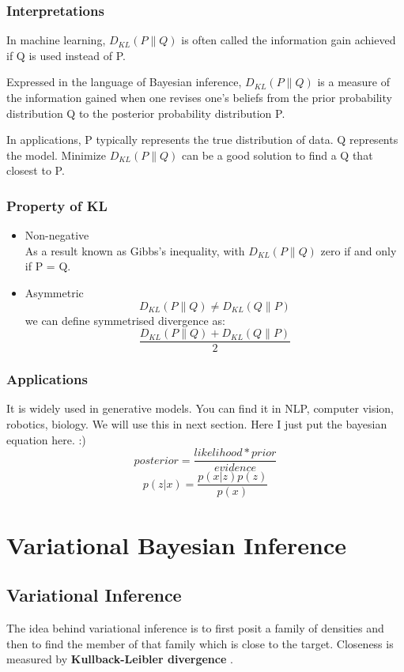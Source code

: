 \documentclass{article}
\begin{document}
\subsubsection{Interpretations}
In machine learning, $D_{KL}(P \parallel Q)$ is often called the information gain achieved if Q is used instead of P.

Expressed in the language of Bayesian inference, $D_{KL}(P \parallel Q)$ is a measure of the information gained when one revises one's beliefs from the prior probability distribution Q to the posterior probability distribution P.

In applications, P typically represents the true distribution of data. Q represents the model. Minimize $D_{KL}(P \parallel Q)$ can be a good solution to find a Q that closest to P.  
\subsubsection{Property of KL}
\begin{itemize}
\item Non-negative \\
As a result known as Gibbs's inequality, with $D_{KL}(P \parallel Q)$ zero if and only if P = Q.
\item Asymmetric
$$D_{KL}(P \parallel Q) \neq D_{KL}(Q \parallel P)$$
we can define symmetrised divergence as:
$$\frac{D_{KL}(P \parallel Q) + D_{KL}(Q \parallel P)}{2}$$
\end{itemize}
\subsubsection{Applications}
It is widely used in generative models. You can find it in NLP, computer vision, robotics, biology. We will use this in next section. Here I just put the bayesian equation here. :)
$$posterior=\frac{likelihood * prior}{evidence}$$
$$p(z|x)=\frac{p(x|z)p(z)}{p(x)}$$

\section{Variational Bayesian Inference}
\subsection{Variational Inference}
The idea behind variational inference
\cite{doi:10.1080/01621459.2017.1285773} is to first posit a family of densities and then to find the member of that family which is close to the target. Closeness is measured by \textbf{Kullback-Leibler divergence} .
\end{document}
